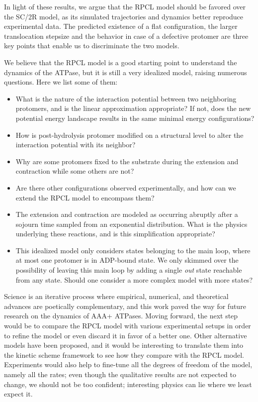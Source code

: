 In light of these results, we argue that the RPCL model should be favored over the SC/2R model, as its simulated trajectories and dynamics better reproduce experimental data. The predicted existence of a flat configuration, the larger translocation stepsize and the behavior in case of a defective protomer are three key points that enable us to discriminate the two models. 

We believe that the RPCL model is a good starting point to understand the dynamics of the ATPase, but it is still a very idealized model, raising numerous questions. Here we list some of them:
\begin{itemize}
    \item What is the nature of the interaction potential between two neighboring protomers, and is the linear approximation appropriate? If not, does the new potential energy landscape results in the same minimal energy configurations?
    \item How is post-hydrolysis protomer modified on a structural level to alter the interaction potential with its neighbor?
    \item Why are some protomers fixed to the substrate during the extension and contraction while some others are not?
    \item Are there other configurations observed experimentally, and how can we extend the RPCL model to encompass them?
    \item The extension and contraction are modeled as occurring abruptly after a sojourn time sampled from an exponential distribution. What is the physics underlying these reactions, and is this simplification appropriate?
    \item This idealized model only considers states belonging to the main loop, where at most one protomer is in ADP-bound state. We only skimmed over the possibility of leaving this main loop by adding a single \emph{out} state reachable from any state. Should one consider a more complex model with more states?
\end{itemize}

Science is an iterative process where empirical, numerical, and theoretical advances are poetically complementary, and this work paved the way for future research on the dynamics of AAA+ ATPases. Moving forward, the next step would be to compare the RPCL model with various experimental setups in order to refine the model or even discard it in favor of a better one. Other alternative models have been proposed\cite{lin_aaa+_2022}, and it would be interesting to translate them into the kinetic scheme framework to see how they compare with the RPCL model. Experiments would also help to fine-tune all the degrees of freedom of the model, namely all the rates; even though the qualitative results are not expected to change, we should not be too confident; interesting physics can lie where we least expect it. 
